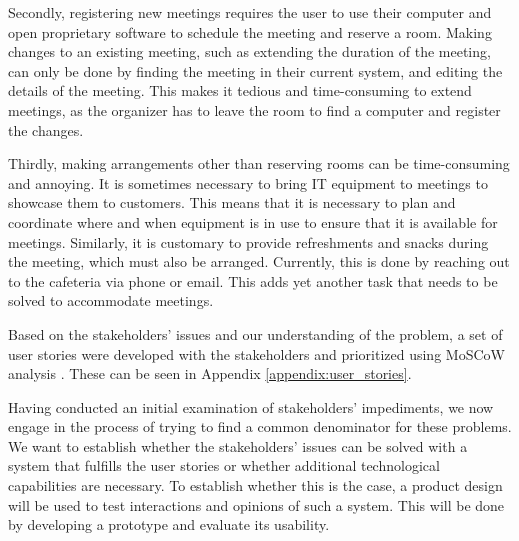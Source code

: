 Secondly, registering new meetings requires the user to use their computer and open proprietary software to schedule the meeting and reserve a room.
Making changes to an existing meeting, such as extending the duration of the meeting, can only be done by finding the meeting in their current system, and editing the details of the meeting.
This makes it tedious and time-consuming to extend meetings, as the organizer has to leave the room to find a computer and register the changes.

Thirdly, making arrangements other than reserving rooms can be time-consuming and annoying. 
It is sometimes necessary to bring IT equipment to meetings to showcase them to customers.
This means that it is necessary to plan and coordinate where and when equipment is in use to ensure that it is available for meetings. 
Similarly, it is customary to provide refreshments and snacks during the meeting, which must also be arranged. 
Currently, this is done by reaching out to the cafeteria via phone or email.
This adds yet another task that needs to be solved to accommodate meetings.

Based on the stakeholders' issues and our understanding of the problem, a set of user stories were developed with the stakeholders and prioritized using MoSCoW analysis \cite{DEBbook}.
These can be seen in Appendix \ref{appendix:user_stories}.

Having conducted an initial examination of stakeholders' impediments, we now engage in the process of trying to find a common denominator for these problems.
We want to establish whether the stakeholders' issues can be solved with a system that fulfills the user stories or whether additional technological capabilities are necessary. 
To establish whether this is the case, a product design will be used to test interactions and opinions of such a system.
This will be done by developing a prototype and evaluate its usability.